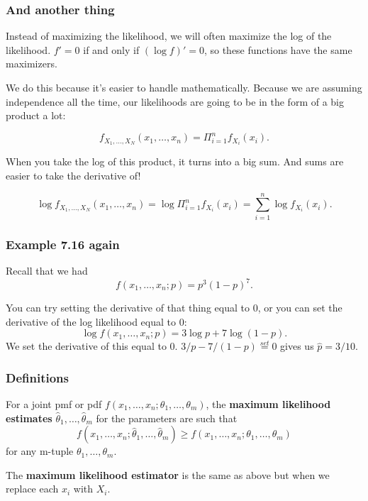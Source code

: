 \documentclass{beamer}
\begin{document}
\begin{frame}
\frametitle{And another thing}

Instead of maximizing the likelihood, we will often maximize the log of the likelihood. $f' = 0$ if and only if $(\log f)' = 0$, so these functions have the same maximizers. 
\newline

We do this because it's easier to handle mathematically. Because we are assuming independence all the time, our likelihoods are going to be in the form of a big product a lot:

\[
f_{X_1, \ldots, X_N}(x_1, \ldots, x_n) = \Pi_{i=1}^n f_{X_i}(x_i).
\]

When you take the log of this product, it turns into a big sum. And sums are easier to take the derivative of!

\[
\log f_{X_1, \ldots, X_N}(x_1, \ldots, x_n) = \log \Pi_{i=1}^n f_{X_i}(x_i) = \sum_{i=1}^n \log f_{X_i}(x_i).
\]


\end{frame}


\begin{frame}
\frametitle{Example 7.16 again}

Recall that we had 
\[
f(x_1, \ldots, x_n; p) = p^3(1-p)^7.
\]

You can try setting the derivative of that thing equal to $0$, or you can set the derivative of the log likelihood equal to $0$:
\[
\log f(x_1, \ldots, x_n; p) = 3 \log p + 7 \log(1-p).
\]
We set the derivative of this equal to $0$. $3/p - 7/(1-p) \overset{set}{=} 0$ gives us $\hat{p} = 3/10$.
\end{frame}


\begin{frame}
\frametitle{Definitions}

For a joint pmf or pdf $f(x_1, \ldots, x_n; \theta_1, \ldots, \theta_m)$, the \textbf{maximum likelihood estimates} $\hat{\theta}_1, \ldots, \hat{\theta}_m$ for the parameters are such that
\[
f(x_1, \ldots, x_n; \hat{\theta}_1, \ldots, \hat{\theta}_m) \ge f(x_1, \ldots, x_n; \theta_1, \ldots, \theta_m)
\]
for any m-tuple $\theta_1, \ldots, \theta_m$.
\newline

The \textbf{maximum likelihood estimator} is the same as above but when we replace each $x_i$ with $X_i$.
\end{frame}
\end{document}
